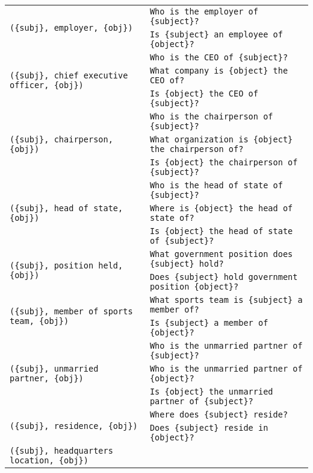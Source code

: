 \begin{table*}[]
\small
    \centering
    \begin{tabular}{p{6cm}p{12cm}}
\multirow{2}{6cm}{
    \texttt{(\{subj\}, employer, \{obj\})}
} & \verb|Who is the employer of {subject}?| \\
& \verb|Is {subject} an employee of {object}?| \\
\multirow{3}{6cm}{
    \texttt{(\{subj\}, chief executive officer, \{obj\})}
} & \verb|Who is the CEO of {subject}?| \\
& \verb|What company is {object} the CEO of?| \\
& \verb|Is {object} the CEO of {subject}?| \\
\multirow{3}{6cm}{
    \texttt{(\{subj\}, chairperson, \{obj\})}
} & \verb|Who is the chairperson of {subject}?| \\
& \verb|What organization is {object} the chairperson of?| \\
& \verb|Is {object} the chairperson of {subject}?| \\
\multirow{3}{6cm}{
    \texttt{(\{subj\}, head of state, \{obj\})}
} & \verb|Who is the head of state of {subject}?| \\
& \verb|Where is {object} the head of state of?| \\
& \verb|Is {object} the head of state of {subject}?| \\
\multirow{2}{6cm}{
    \texttt{(\{subj\}, position held, \{obj\})}
} & \verb|What government position does {subject} hold?| \\
& \verb|Does {subject} hold government position {object}?| \\
\multirow{2}{6cm}{
    \texttt{(\{subj\}, member of sports team, \{obj\})}
} & \verb|What sports team is {subject} a member of?| \\
& \verb|Is {subject} a member of {object}?| \\
\multirow{3}{6cm}{
    \texttt{(\{subj\}, unmarried partner, \{obj\})}
} & \verb|Who is the unmarried partner of {subject}?| \\
& \verb|Who is the unmarried partner of {object}?| \\
& \verb|Is {object} the unmarried partner of {subject}?| \\
\multirow{2}{6cm}{
    \texttt{(\{subj\}, residence, \{obj\})}
} & \verb|Where does {subject} reside?| \\
& \verb|Does {subject} reside in {object}?| \\
\multirow{2}{6cm}{
    \texttt{(\{subj\}, headquarters location, \{obj\})}
}
\end{tabular}
\end{table*}
